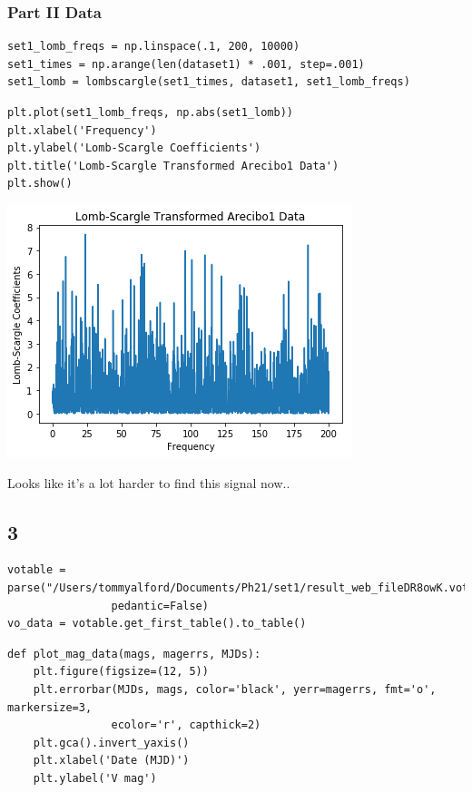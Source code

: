 \documentclass[11pt]{article}
\begin{document}
\subsubsection*{Part II Data}
\label{sec-3-2-2}

\begin{verbatim}
set1_lomb_freqs = np.linspace(.1, 200, 10000)
set1_times = np.arange(len(dataset1) * .001, step=.001)
set1_lomb = lombscargle(set1_times, dataset1, set1_lomb_freqs)
\end{verbatim}


\begin{verbatim}
plt.plot(set1_lomb_freqs, np.abs(set1_lomb))
plt.xlabel('Frequency')
plt.ylabel('Lomb-Scargle Coefficients')
plt.title('Lomb-Scargle Transformed Arecibo1 Data')
plt.show()
\end{verbatim}

\includegraphics[width=.9\linewidth]{./obipy-resources/17087vyR.png}

Looks like it's a lot harder to find this signal now..

\subsection*{3}
\label{sec-3-3}
\begin{verbatim}
votable = parse("/Users/tommyalford/Documents/Ph21/set1/result_web_fileDR8owK.vot", 
                pedantic=False)
vo_data = votable.get_first_table().to_table()
\end{verbatim}


\begin{verbatim}
def plot_mag_data(mags, magerrs, MJDs):
    plt.figure(figsize=(12, 5))
    plt.errorbar(MJDs, mags, color='black', yerr=magerrs, fmt='o', markersize=3,
                ecolor='r', capthick=2)
    plt.gca().invert_yaxis()
    plt.xlabel('Date (MJD)')
    plt.ylabel('V mag')
\end{verbatim}
\end{document}
